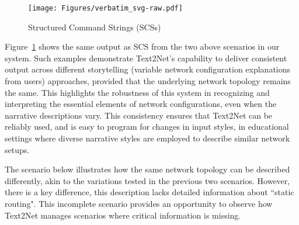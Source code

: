 \begin{figure}[ht!]
    \centering
    \texttt{[image: Figures/verbatim\_svg-raw.pdf]}
    \caption{Structured Command Strings (SCSs)}
    \vspace{-4mm}
    \label{fig: SCS}
\end{figure}


Figure~\ref{fig: SCS} shows the same output as SCS from the two above scenarios in our system. Such examples demonstrate Text2Net's capability to deliver consistent output across different storytelling (variable network configuration explanations from users) approaches, provided that the underlying network topology remains the same. This highlights the robustness of this system in recognizing and interpreting the essential elements of network configurations, even when the narrative descriptions vary. This consistency ensures that Text2Net can be reliably used, and is easy to program for changes in input styles, in educational settings where diverse narrative styles are employed to describe similar network setups.

The scenario below illustrates how the same network topology can be described differently, akin to the variations tested in the previous two scenarios. However, there is a key difference, this description lacks detailed information about ``static routing". This incomplete scenario provides an opportunity to observe how Text2Net manages scenarios where critical information is missing.

